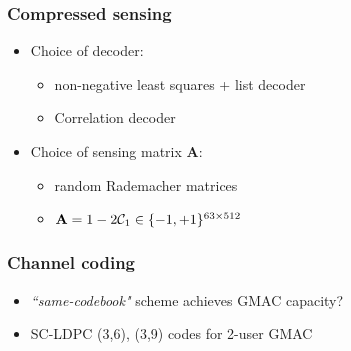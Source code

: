 \begin{frame}\frametitle{Compressed sensing}
\begin{itemize}
\item Choice of decoder:
	\begin{itemize}
		\item non-negative least squares + list decoder
		\item Correlation decoder
	\end{itemize}
\vspace{2pt}
\item Choice of sensing matrix $\mathbf{A}$:
	\begin{itemize}
		\item random Rademacher matrices
		\item $\mathbf{A}=1-2\mathcal{C}_1\in\{-1,+1\}^{63\times 512}$
	\end{itemize}
\end{itemize}
\centering
\resizebox{0.7\textwidth}{0.4\textwidth}{}
\end{frame}


\begin{frame}
\frametitle{Channel coding}
\begin{itemize}
\item \emph{``same-codebook"} scheme achieves GMAC capacity?
\item SC-LDPC (3,6), (3,9) codes for 2-user GMAC
\end{itemize}
\centering
\resizebox{0.55\textwidth}{!}{}
\end{frame}

